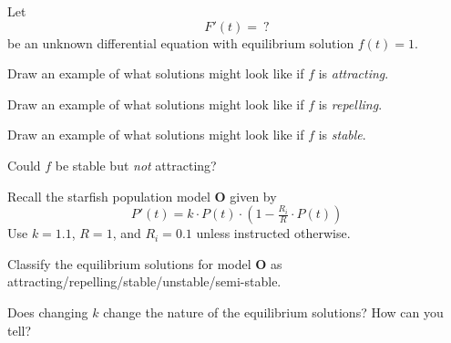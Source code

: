\documentclass{workbook}
\begin{document}
\begin{slide}
	\question


\end{slide}

\begin{slide}

	Let
	\[
		F'(t) =\ ?
	\]
	be an unknown differential equation with equilibrium solution $f(t)=1$.

	\begin{parts}
		\item Draw an example of what solutions might look like if $f$ is \emph{attracting}.
		\item Draw an example of what solutions might look like if $f$ is \emph{repelling}.
		\item Draw an example of what solutions might look like if $f$ is \emph{stable}.
		\item Could $f$ be stable but \emph{not} attracting?
	\end{parts}
\end{slide}

\begin{slide}
	\question
	
	
	Recall the starfish population model \textbf{O} given by
	\[
		P'(t) = k\cdot P(t)\cdot \left(1-\tfrac{R_i}{R}\cdot P(t)\right)
	\]
	Use $k=1.1$, $R=1$, and $R_i=0.1$ unless instructed otherwise.


	\begin{parts}
		\item Classify the equilibrium solutions for model \textbf{O} as attracting/repelling/stable/unstable/semi-stable.
		\item Does changing $k$ change the nature of the equilibrium solutions? How can you tell?
	\end{parts}
\end{slide}

%
%
\end{document}
